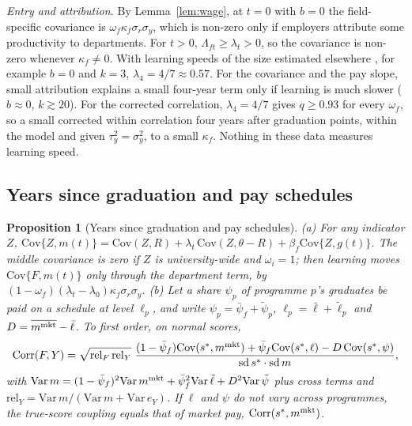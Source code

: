 \documentclass[11pt]{article}
\newtheorem{sprop}{Proposition}
\begin{document}
\emph{Entry and attribution.} By Lemma~\ref{lem:wage}, at $t=0$ with $b=0$ the field-specific covariance is
$\omega_f\kappa_f\sigma_r\sigma_y$, which is non-zero only if employers attribute some productivity to departments.
For $t>0$, $\Lambda_{ft}\ge\lambda_t>0$, so the covariance is non-zero whenever $\kappa_f\neq0$. With learning speeds
of the size estimated elsewhere \citep{lange2007speed, arcidiacono2010beyond}, for example $b=0$ and $k=3$,
$\lambda_4=4/7\approx0.57$. For the covariance and the pay slope, small attribution explains a small four-year term
only if learning is much slower ($b\approx0$, $k\gtrsim20$). For the corrected correlation, $\lambda_4=4/7$ gives
$q\ge0.93$ for every $\omega_f$, so a small corrected within correlation four years after graduation points, within
the model and given $\tau_y^2=\sigma_y^2$, to a small $\kappa_f$. Nothing in these data measures learning speed.

\subsection{Years since graduation and pay schedules}

\begin{sprop}[Years since graduation and pay schedules]\label{prop:time}
(a) For any indicator $Z$, $\mathrm{Cov}\{Z,m(t)\}=\mathrm{Cov}(Z,R)+\lambda_t\,\mathrm{Cov}(Z,\theta-R)+
\beta_f\mathrm{Cov}\{Z,g(t)\}$. The middle covariance is zero if $Z$ is university-wide and $\omega_i=1$; then
learning moves $\mathrm{Cov}\{F,m(t)\}$ only through the department term, by
$(1-\omega_f)(\lambda_t-\lambda_0)\kappa_f\sigma_r\sigma_y$.
(b) Let a share $\psi_p$ of programme $p$'s graduates be paid on a schedule at level $\ell_p$, and write
$\psi_p=\bar\psi_f+\tilde\psi_p$, $\ell_p=\bar\ell+\tilde\ell_p$ and $D=\overline{m^{\rm mkt}}-\bar\ell$. To first
order, on normal scores,
\[
\mathrm{Corr}(F,Y)=\sqrt{\mathrm{rel}_F\,\mathrm{rel}_Y}\;
\frac{(1-\bar\psi_f)\mathrm{Cov}(s^*,m^{\rm mkt})+\bar\psi_f\mathrm{Cov}(s^*,\ell)-D\,\mathrm{Cov}(s^*,\psi)}
{\mathrm{sd}\,s^*\cdot\mathrm{sd}\,m},
\]
with $\mathrm{Var}\,m=(1-\bar\psi_f)^2\mathrm{Var}\,m^{\rm mkt}+\bar\psi_f^2\mathrm{Var}\,\tilde\ell+
D^2\mathrm{Var}\,\tilde\psi$ plus cross terms and $\mathrm{rel}_Y=\mathrm{Var}\,m/(\mathrm{Var}\,m+
\mathrm{Var}\,e_Y)$. If $\ell$ and $\psi$ do not vary across programmes, the true-score coupling equals that of
market pay, $\mathrm{Corr}(s^*,m^{\rm mkt})$.
\end{sprop}
\end{document}
